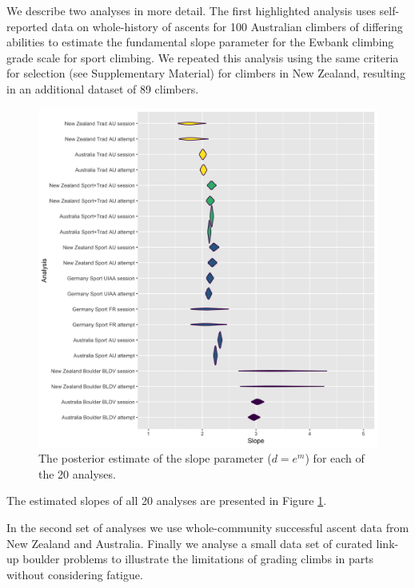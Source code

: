 \documentclass{article}
\begin{document}
\afterpage{%
    \clearpage%
    \thispagestyle{empty}%
    \begin{landscape}%
       
    \end{landscape}
    \clearpage%
}


We describe two analyses in more detail. The first highlighted analysis uses self-reported data on whole-history of ascents for 100 Australian climbers of differing abilities to estimate the fundamental slope parameter for the Ewbank climbing grade scale for sport climbing. We repeated this analysis using the same criteria for selection (see Supplementary Material) for climbers in New Zealand, resulting in an additional dataset of 89 climbers. 


\begin{figure}
\centering
\includegraphics[width=\textwidth]{../R/final-plot.png}
\caption{\small The posterior estimate of the slope parameter ($d=e^m$) for each of the 20 analyses.}
\label{finalplot}
\end{figure}

The estimated slopes of all 20 analyses are presented in Figure \ref{finalplot}.

In the second set of analyses we use whole-community successful ascent data from New Zealand and Australia. Finally we analyse a small data set of curated link-up boulder problems to illustrate the limitations of grading climbs in parts without considering fatigue.
\end{document}
